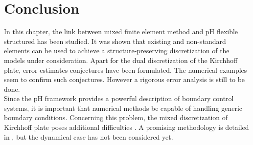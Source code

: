 \section{Conclusion}
In this chapter, the link between mixed finite element method and pH flexible structured has been studied. It was shown that existing and non-standard elements can be used to achieve a structure-preserving discretization of the models under consideration.  Apart for the dual discretization of the Kirchhoff plate, error estimates conjectures have been formulated. The numerical examples seem to confirm such conjectures. However a rigorous error analysis is still to be done. \\


Since the pH framework provides a powerful description of boundary control systems, it is important that numerical methods be capable of handling generic boundary conditions. Concerning this problem, the mixed discretization of Kirchhoff plate poses additional difficulties \cite{blum1990}.  A promising methodology is detailed in \cite{rafetseder2018siam}, but the dynamical case has not been considered yet. 